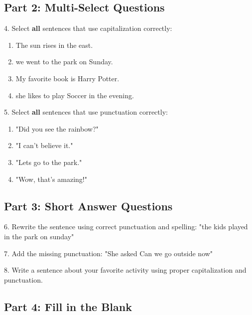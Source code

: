 \documentclass[12pt]{article}
\begin{document}
\subsection*{Part 2: Multi-Select Questions}

4. Select \textbf{all} sentences that use capitalization correctly:
\begin{enumerate}[label=\Alph*.]
    \item The sun rises in the east.  
    \item we went to the park on Sunday.  
    \item My favorite book is Harry Potter.  
    \item she likes to play Soccer in the evening.  
\end{enumerate}

\vspace{1cm}

5. Select \textbf{all} sentences that use punctuation correctly:
\begin{enumerate}[label=\Alph*.]
    \item "Did you see the rainbow?"  
    \item "I can’t believe it."  
    \item "Lets go to the park."  
    \item "Wow, that’s amazing!"  
\end{enumerate}

\vspace{1cm}

\subsection*{Part 3: Short Answer Questions}

6. Rewrite the sentence using correct punctuation and spelling: "the kids played \\in the park on sunday"

\vspace{3cm}

7. Add the missing punctuation: "She asked Can we go outside now"

\vspace{3cm}

8. Write a sentence about your favorite activity using proper capitalization and \\punctuation.

\vspace{3cm}

\subsection*{Part 4: Fill in the Blank}
\end{document}
